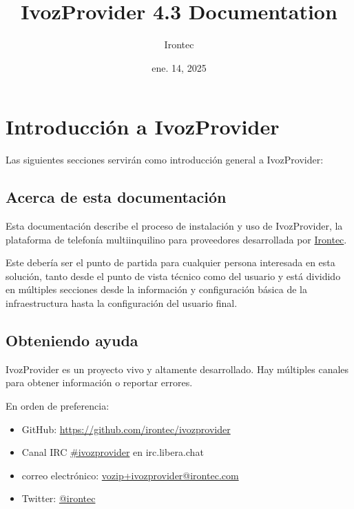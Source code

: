 \documentclass[letterpaper,10pt,spanish]{sphinxmanual}
\title{IvozProvider 4.3 Documentation}
\date{ene. 14, 2025}
\author{Irontec}
\begin{document}
\maketitle
\tableofcontents
{}\label{index::doc}



\chapter{Introducción a IvozProvider}
\label{basic_concepts/intro/index::doc}\label{basic_concepts/intro/index:introduction-to-ivozprovider}\label{basic_concepts/intro/index:ivozprovider-official-documentation}
Las siguientes secciones servirán como introducción general a IvozProvider:


\section{Acerca de esta documentación}
\label{basic_concepts/intro/about::doc}\label{basic_concepts/intro/about:about-this-documentation}
Esta documentación describe el proceso de instalación y uso de IvozProvider, la plataforma de telefonía multiinquilino para proveedores desarrollada por \href{http://irontec.com}{Irontec}.

Este debería ser el punto de partida para cualquier persona interesada en esta solución, tanto desde el punto de vista técnico como del usuario y está dividido en múltiples secciones desde la información y configuración básica de la infraestructura hasta la configuración del usuario final.


\section{Obteniendo ayuda}
\label{basic_concepts/intro/getting_help:getting-help}\label{basic_concepts/intro/getting_help::doc}\label{basic_concepts/intro/getting_help:id1}
IvozProvider es un proyecto vivo y altamente desarrollado. Hay múltiples canales para obtener información o reportar errores.

En orden de preferencia:
\begin{itemize}
\item {} 
GitHub: \url{https://github.com/irontec/ivozprovider}

\item {} 
Canal IRC \href{https://kiwiirc.com/nextclient/irc.libera.chat/\#ivozprovider}{\#ivozprovider} en irc.libera.chat

\item {} 
correo electrónico: \href{mailto:vozip+ivozprovider@irontec.com}{vozip+ivozprovider@irontec.com}

\item {} 
Twitter: \href{https://twitter.com/irontec}{@irontec}

\end{itemize}
\end{document}
